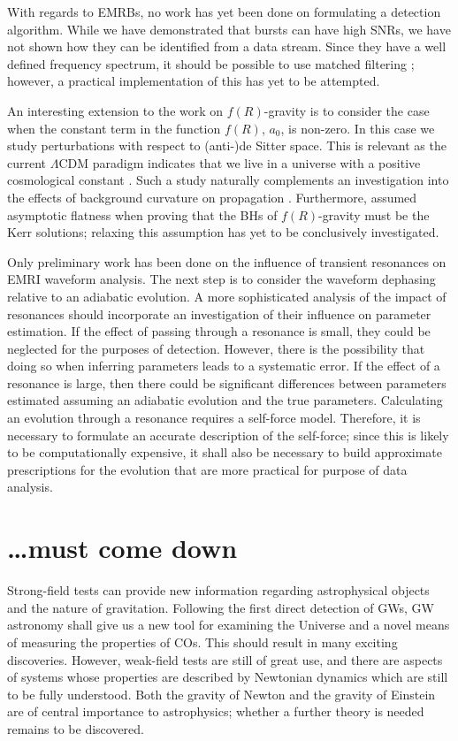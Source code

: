 With regards to EMRBs, no work has yet been done on formulating a detection algorithm. While we have demonstrated that bursts can have high SNRs, we have not shown how they can be identified from a data stream. Since they have a well defined frequency spectrum, it should be possible to use matched filtering \citep[cf.][]{Feroz2010}; however, a practical implementation of this has yet to be attempted.

An interesting extension to the work on $f(R)$-gravity is to consider the case when the constant term in the function $f(R)$, $a_0$, is non-zero. In this case we study perturbations with respect to (anti-)de Sitter space. This is relevant as the current $\Lambda$CDM paradigm indicates that we live in a universe with a positive cosmological constant \citep{Komatsu2011,Hinshaw2012,Ade2013b}. Such a study naturally complements an investigation into the effects of background curvature on propagation \citep{Yang2011}. Furthermore, \citet{Sotiriou2011} assumed asymptotic flatness when proving that the BHs of $f(R)$-gravity must be the Kerr solutions; relaxing this assumption has yet to be conclusively investigated.

Only preliminary work has been done on the influence of transient resonances on EMRI waveform analysis. The next step is to consider the waveform dephasing relative to an adiabatic evolution. A more sophisticated analysis of the impact of resonances should incorporate an investigation of their influence on parameter estimation. If the effect of passing through a resonance is small, they could be neglected for the purposes of detection. However, there is the possibility that doing so when inferring parameters leads to a systematic error. If the effect of a resonance is large, then there could be significant differences between parameters estimated assuming an adiabatic evolution and the true parameters. Calculating an evolution through a resonance requires a self-force model. Therefore, it is necessary to formulate an accurate description of the self-force; since this is likely to be computationally expensive, it shall also be necessary to build approximate prescriptions for the evolution that are more practical for purpose of data analysis.

\section{\ldots must come down}

Strong-field tests can provide new information regarding astrophysical objects and the nature of gravitation. Following the first direct detection of GWs, GW astronomy shall give us a new tool for examining the Universe and a novel means of measuring the properties of COs. This should result in many exciting discoveries. However, weak-field tests are still of great use, and there are aspects of systems whose properties are described by Newtonian dynamics which are still to be fully understood. Both the gravity of Newton and the gravity of Einstein are of central importance to astrophysics; whether a further theory is needed remains to be discovered.
